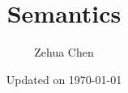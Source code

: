 \documentclass{report}
\title{Semantics}
\author{Zehua Chen}
\date{Updated on \today}
\begin{document}
  \maketitle
  \tableofcontents

  \setmainstyles
\end{document}
